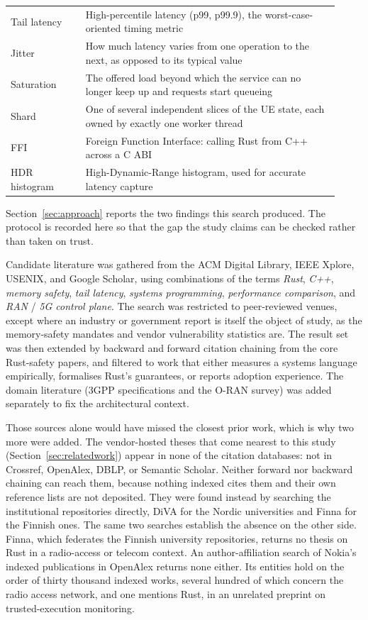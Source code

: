 \documentclass[english,oneside,a4paper,censored,csm,software-track-2020]{HYthesisML}
\begin{document}
\begin{appendices}
\begin{table}[H]
\begin{tabular}{@{}p{0.21\linewidth} p{0.71\linewidth}@{}}
Tail latency & High-percentile latency (p99, p99.9), the worst-case-oriented timing metric \\
Jitter & How much latency varies from one operation to the next, as opposed to its typical value \\
Saturation & The offered load beyond which the service can no longer keep up and requests start queueing \\
Shard & One of several independent slices of the UE state, each owned by exactly one worker thread \\
FFI & Foreign Function Interface: calling Rust from C++ across a C ABI \\
HDR histogram & High-Dynamic-Range histogram, used for accurate latency capture \\
\hline
\end{tabular}
\end{table}

Section~\ref{sec:approach} reports the two findings this search produced. The protocol is recorded
here so that the gap the study claims can be checked rather than taken on trust.

Candidate literature was gathered from the ACM Digital Library, IEEE Xplore, USENIX, and Google
Scholar, using combinations of the terms \emph{Rust}, \emph{C++}, \emph{memory safety}, \emph{tail
latency}, \emph{systems programming}, \emph{performance comparison}, and \emph{RAN} / \emph{5G
control plane}. The search was restricted to peer-reviewed venues, except where an industry or
government report is itself the object of study, as the memory-safety mandates and vendor
vulnerability statistics are.
The result set was then extended by backward and forward citation chaining from the core
Rust-safety papers, and filtered to work that either measures a systems language empirically,
formalises Rust's guarantees, or reports adoption experience. The domain literature (3GPP specifications and
the O-RAN survey) was added separately to fix the architectural context.

Those sources alone would have missed the closest prior work, which is why two more were added.
The vendor-hosted theses that come nearest to this study (Section~\ref{sec:relatedwork}) appear in
none of the citation databases: not in Crossref, OpenAlex, DBLP, or Semantic Scholar. Neither
forward nor backward chaining can reach them, because nothing indexed cites them and their own
reference lists are not deposited. They were found instead by searching the institutional
repositories directly, DiVA for the Nordic universities and Finna for the Finnish ones. The same
two searches establish the absence on the other side. Finna, which federates the Finnish
university repositories, returns no thesis on Rust in a radio-access or telecom context. An
author-affiliation search of Nokia's indexed publications in OpenAlex returns none either. Its
entities hold on the order of thirty thousand indexed works, several hundred of which concern the
radio access network, and one mentions Rust, in an unrelated preprint on trusted-execution
monitoring.


\end{appendices}
\end{document}
